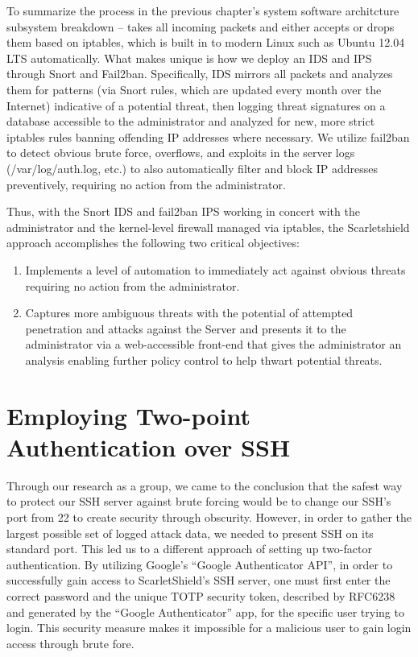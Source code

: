 \documentclass[12pt,letterpaper,titlepage]{report}
\begin{document}
{To summarize the process in the previous chapter's system software architcture subsystem
breakdown -- \scarletshield takes all incoming packets and either accepts or drops them based
on iptables, which is built in to modern Linux \distros such as Ubuntu 12.04 LTS
automatically.  What makes \scarletshield unique is how we deploy an IDS and IPS
through Snort and Fail2ban.  Specifically, IDS mirrors all packets and analyzes
them for patterns (via Snort rules, which are updated every month over the
Internet) indicative of a potential threat, then logging threat signatures on a
database accessible to the administrator and analyzed for new, more strict
iptables rules banning offending IP addresses where necessary.  We utilize
fail2ban to detect obvious brute force, overflows, and exploits in the server
logs (/var/log/auth.log, etc.) to also automatically filter and block IP
addresses preventively, requiring no action from the administrator.

Thus, with the Snort IDS and fail2ban IPS working in concert with the
administrator and the kernel-level firewall managed via iptables, the 
Scarletshield approach accomplishes the following two critical objectives:

\begin{enumerate}
\item Implements a level of automation to immediately act against obvious threats requiring no action from the administrator.

\item Captures more ambiguous threats with the potential of attempted penetration 
and attacks against the Server and presents it to the administrator via a web-accessible 
front-end that gives the administrator an analysis enabling further policy control to help thwart potential threats. 

\end{enumerate}


\section{Employing Two-point Authentication over SSH}

Through our research as a group, we came to the conclusion that the safest way
to protect our SSH  server against brute forcing would be to change our SSH’s
port from 22 to create security through obscurity.  However, 
in order to gather the largest possible set of logged attack data,
we needed to present SSH on its standard port.
This led us to a different approach of setting up two-factor
authentication.  By utilizing Google’s ``Google Authenticator API'', 
in order to successfully
gain access to ScarletShield’s SSH server, one must first enter the correct
password and the unique TOTP security token, described by RFC6238 and generated by the
``Google Authenticator'' app, for the specific user trying to login.  This security
measure makes it impossible for a malicious user to gain login access through
brute fore.

}
\end{document}
